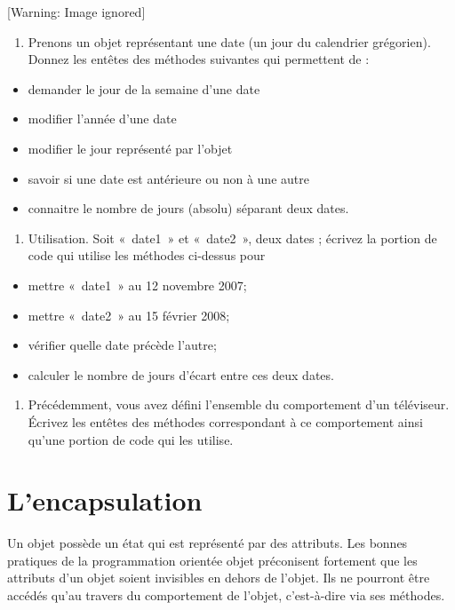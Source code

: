 \begin{center}
 [Warning: Image ignored] %

\end{center}
\liststyleWWviiiNumi
\begin{enumerate}
\item {
Prenons un objet représentant une date (un jour du calendrier
grégorien). Donnez les entêtes des méthodes suivantes qui permettent de
:}
\end{enumerate}
\liststyleListv
\begin{itemize}
\item {
demander le jour de la semaine d'une date}
\item {
modifier l'année d'une date}
\item {
modifier le jour représenté par l'objet}
\item {
savoir si une date est antérieure ou non à une autre}
\item {
connaitre le nombre de jours (absolu) séparant deux dates.}
\end{itemize}
\liststyleWWviiiNumi
\begin{enumerate}
\item {
Utilisation. Soit «~date1~» et «~date2~», deux dates ; écrivez la
portion de code qui utilise les méthodes ci-dessus pour}
\end{enumerate}
\liststyleListv
\begin{itemize}
\item {
mettre «~date1~» au 12 novembre 2007;}
\item {
mettre «~date2~» au 15 février 2008;}
\item {
vérifier quelle date précède l'autre;}
\item {
calculer le nombre de jours d'écart entre ces deux
dates.}
\end{itemize}
\liststyleWWviiiNumi
\begin{enumerate}
\item {
Précédemment, vous avez défini l'ensemble du
comportement d'un téléviseur. Écrivez les entêtes des
méthodes correspondant à ce comportement ainsi qu'une
portion de code qui les utilise.}
\end{enumerate}

\bigskip

\section{L'encapsulation}
{
Un objet possède un état qui est représenté par des attributs. Les
bonnes pratiques de la programmation orientée objet préconisent
fortement que les attributs d'un objet soient
invisibles en dehors de l'objet. Ils ne pourront être
accédés qu'au travers du comportement de
l'objet, c'est-à-dire via ses
méthodes.}


